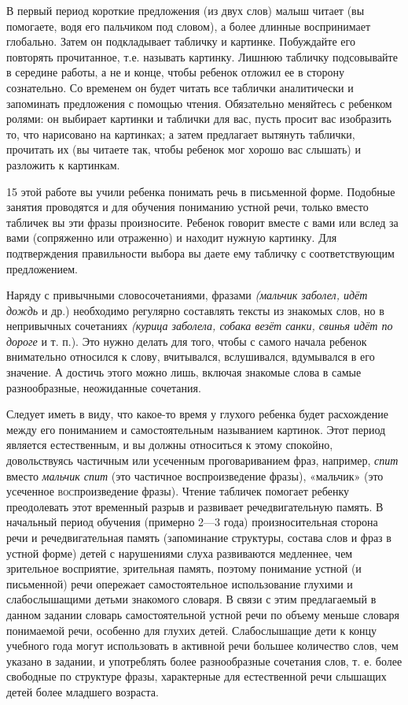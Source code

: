 \documentclass[a5paper]{book}
\renewcommand{\emph}[1]{\textit{#1}}
\begin{document}
В первый период короткие предложения (из двух слов) малыш читает (вы
помогаете, водя его пальчиком под словом), а более длинные воспринимает
глобально. Затем он подкладывает табличку и картинке. Побуждайте его
повторять прочитанное, т.е. называть картинку. Лишнюю табличку
подсовывайте в середине работы, а не и конце, чтобы ребенок отложил ее в
сторону сознательно. Со временем он будет читать все таблички
аналитически и запоминать предложения с помощью чтения. Обязательно
меняйтесь с ребенком ролями: он выбирает картинки и таблички для вас,
пусть просит вас изобразить то, что нарисовано на картинках; а затем
предлагает вытянуть таблички, прочитать их (вы читаете так, чтобы
ребенок мог хорошо вас слышать) и разложить к картинкам.

15 этой работе вы учили ребенка понимать речь в письменной форме.
Подобные занятия проводятся и для обучения пониманию устной речи, только
вместо табличек вы эти фразы произносите. Ребенок говорит вместе с вами
или вслед за вами (сопряженно или отраженно) и находит нужную картинку.
Для подтверждения правильности выбора вы даете ему табличку с
соответствующим предложением.

Наряду с привычными словосочетаниями, фразами \emph{(мальчик заболел,
идёт дождь} и др.) необходимо регулярно составлять тексты из знакомых
слов, но в непривычных сочетаниях \emph{(курица заболела, собака везёт
санки, свинья идёт по дороге} и т. п.). Это нужно делать для того, чтобы
с самого начала ребенок внимательно относился к слову, вчитывался,
вслушивался, вдумывался в его значение. А достичь этого можно лишь,
включая знакомые слова в самые разнообразные, неожиданные сочетания.

Следует иметь в виду, что какое-то время у глухого ребенка будет
расхождение между его пониманием и самостоятельным называнием картинок.
Этот период является естественным, и вы должны относиться к этому
спокойно, довольствуясь частичным или усеченным проговариванием фраз,
например, \emph{спит} вместо \emph{мальчик спит} (это частичное
воспроизведение фразы), «мальчик» (это усеченное
\textsc{вос}произведение фразы). Чтение табличек помогает ребенку
преодолевать этот временный разрыв и развивает речедвигательную память.
В начальный период обучения (примерно 2---3 года) произносительная
сторона речи и речедвигательная память (запоминание структуры, состава
слов и фраз в устной форме) детей с нарушениями слуха развиваются
медленнее, чем зрительное восприятие, зрительная память, поэтому
понимание устной (и письменной) речи опережает самостоятельное
использование глухими и слабослышащими детьми знакомого словаря. В связи
с этим предлагаемый в данном задании словарь самостоятельной устной речи
по объему меньше словаря понимаемой речи, особенно для глухих детей.
Слабослышащие дети к концу учебного года могут использовать в активной
речи большее количество слов, чем указано в задании, и употреблять более
разнообразные сочетания слов, т. е. более свободные по структуре фразы,
характерные для естественной речи слышащих детей более младшего
возраста.
\end{document}
